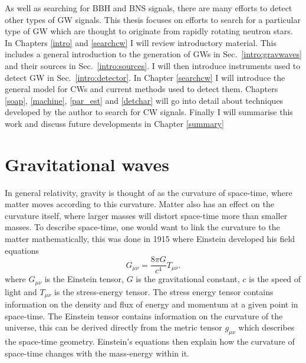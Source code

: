 As well as searching for \gls{BBH} and \gls{BNS} signals, there are many
efforts to detect other types of \gls{GW} signals.  This thesis focuses on
efforts to search for a particular type of \gls{GW} which are thought to
originate from rapidly rotating neutron stars.  In Chapters \ref{intro} and
\ref{searchcw} I will review introductory material.  This includes a general
introduction to the generation of \glspl{GW} in Sec.~\ref{intro:gravwaves} and
their sources in Sec.~\ref{intro:sources}.  I will then introduce instruments
used to detect \gls{GW} in Sec.~\ref{intro:detector}.  In Chapter
\ref{searchcw} I will introduce the general model for \glspl{CW} and current
methods used to detect them.  Chapters \ref{soap}, \ref{machine}, \ref{par_est} and
\ref{detchar} will go into detail about techniques developed by the author to
search for \gls{CW} signals.  Finally I will summarise this work and discuss
future developments in Chapter \ref{summary}



\section{\label{intro:gravwaves}Gravitational waves}

In general relativity, gravity is thought of as the curvature of space-time, where
matter moves according to this curvature. Matter also has
an effect on the curvature itself, where larger masses will distort space-time more than smaller masses. 
To describe space-time, one would want to link the curvature to the matter mathematically, this was done in 1915 \citep{einstein2005GrundlageAllgemeinen} where Einstein developed his field equations
\begin{equation}
\label{intro:gravwaves:efe}
    G_{\mu \nu} = \frac{8 \pi G}{c^4}T_{\mu \nu}.
\end{equation}
where $G_{\mu \nu}$ is the Einstein tensor, $G$ is the gravitational constant, $c$ is the speed of light and $T_{\mu \nu}$ is the
stress-energy tensor.  The stress energy tensor contains information on the density and flux of energy and momentum at a given point in space-time.  
The Einstein tensor contains information on the curvature of the
universe, this can be derived directly from the metric tensor $g_{\mu \nu}$ which describes the space-time geometry.
Einstein's equations then explain how the curvature of space-time changes with
the mass-energy within it.  

